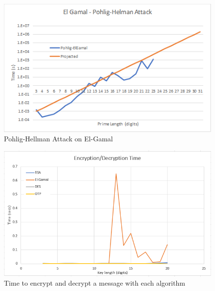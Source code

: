 \documentclass[12pt]{report}
\begin{document}
\begin{figure}[hp!] %
    \begin{center}
        \includegraphics[width=0.85\linewidth]{ElGamalPohlig.PNG}
        \caption{Pohlig-Hellman Attack on El-Gamal}
        \label{fig:el-gamal3}
    \end{center}
\end{figure}

\begin{figure}[hp!] %
    \begin{center}
        \includegraphics[width=0.85\linewidth]{TransferBenchmarks.png}
        \caption{Time to encrypt and decrypt a message with each algorithm}
        \label{fig:TransferBenchmarks}
    \end{center}
\end{figure}
\FloatBarrier
\end{document}
